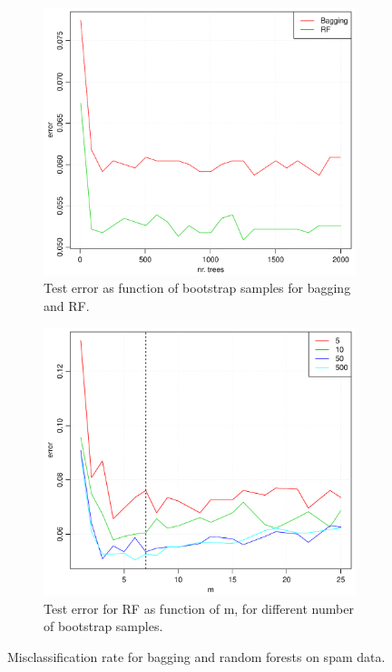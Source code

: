 \begin{figure}[h!]
  \centering
  \begin{subfigure}[b]{0.48\textwidth}
    \includegraphics[width=\textwidth]{./figures/baggingAndRFSpam.pdf}
    \caption{Test error as function of bootstrap samples for bagging and RF.}
    \label{fig:baggingAndRFSpam}
  \end{subfigure}%
  \quad
  \begin{subfigure}[b]{0.48\textwidth}
    \includegraphics[width=\textwidth]{./figures/RFSpam.pdf}
    \caption{Test error for RF as function of m, for different number of bootstrap samples.}
    \label{fig:RFSpam}
  \end{subfigure}
  \vspace{1\baselineskip}
  \caption{Misclassification rate for bagging and random forests on spam data.}
  \label{fig:baggAndRF}
\end{figure}

